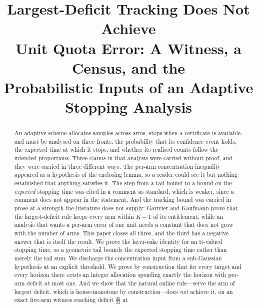 



\title{Largest-Deficit Tracking Does Not Achieve\\
Unit Quota Error: A Witness, a Census, and the\\
Probabilistic Inputs of an Adaptive Stopping Analysis}

\author{
}

\maketitle

\begin{abstract}
An adaptive scheme allocates samples across arms, stops when a certificate is available, and
must be analysed on three fronts: the probability that its confidence event holds, the
expected time at which it stops, and whether its realised counts follow the intended
proportions. Three claims in that analysis were carried without proof, and they were carried
in three different ways. The per-arm concentration inequality appeared as a hypothesis of the
enclosing lemma, so a reader could see it but nothing established that anything satisfies it.
The step from a tail bound to a bound on the \emph{expected} stopping time was cited in a
comment as standard, which is weaker, since a comment does not appear in the statement. And
the tracking bound was carried in prose at a strength the literature does not supply:
Garivier and Kaufmann prove that the largest-deficit rule keeps every arm within $K-1$ of its
entitlement, while an analysis that wants a per-arm error of one unit needs a constant that
does not grow with the number of arms. This paper closes all three, and the third has a
negative answer that is itself the result. We prove the layer-cake identity for an $\mathbb{N}$-valued stopping time, so a
geometric tail bounds the expected stopping time rather than merely the tail sum. We discharge
the concentration input from a sub-Gaussian hypothesis at an explicit threshold. We prove by
construction that for every target and every horizon there \emph{exists} an integer allocation
spending exactly the horizon with per-arm deficit at most one. And we show that the natural
online rule---serve the arm of largest deficit, which is house-monotone by construction---does
\emph{not} achieve it, on an exact five-arm witness reaching deficit $\tfrac{26}{23}$ at

\end{abstract}
